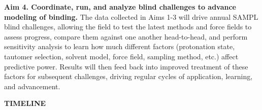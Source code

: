 \documentclass[11pt]{article}
\begin{document}
{\bf Aim 4. Coordinate, run, and analyze blind challenges to advance modeling of binding.}
The data collected in Aims 1-3 will drive annual SAMPL blind challenges, allowing the field to test the latest methods and force fields to assess progress, compare them against one another head-to-head, and perform sensitivity analysis to learn how much different factors (protonation state, tautomer selection, solvent model, force field, sampling method, etc.) affect predictive power. Results will then feed back into improved treatment of these factors for subsequent challenges, driving regular cycles of application, learning, and advancement.




{\bf \large TIMELINE} %
\end{document}
